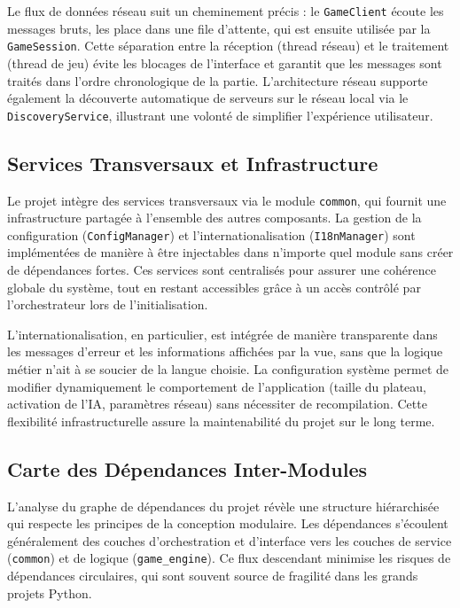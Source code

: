 \documentclass[a4paper]{article}
\begin{document}
Le flux de données réseau suit un cheminement précis : le \texttt{GameClient} écoute les messages bruts, les place dans une file d'attente, qui est ensuite utilisée par la \texttt{GameSession}. Cette séparation entre la réception (thread réseau) et le traitement (thread de jeu) évite les blocages de l'interface et garantit que les messages sont traités dans l'ordre chronologique de la partie. L'architecture réseau supporte également la découverte automatique de serveurs sur le réseau local via le \texttt{DiscoveryService}, illustrant une volonté de simplifier l'expérience utilisateur.

\subsection{Services Transversaux et Infrastructure}

Le projet intègre des services transversaux via le module \texttt{common}, qui fournit une infrastructure partagée à l'ensemble des autres composants. La gestion de la configuration (\texttt{ConfigManager}) et l'internationalisation (\texttt{I18nManager}) sont implémentées de manière à être injectables dans n'importe quel module sans créer de dépendances fortes. Ces services sont centralisés pour assurer une cohérence globale du système, tout en restant accessibles grâce à un accès contrôlé par l'orchestrateur lors de l'initialisation.

L'internationalisation, en particulier, est intégrée de manière transparente dans les messages d'erreur et les informations affichées par la vue, sans que la logique métier n'ait à se soucier de la langue choisie. La configuration système permet de modifier dynamiquement le comportement de l'application (taille du plateau, activation de l'IA, paramètres réseau) sans nécessiter de recompilation. Cette flexibilité infrastructurelle assure la maintenabilité du projet sur le long terme.

\subsection{Carte des Dépendances Inter-Modules}

L'analyse du graphe de dépendances du projet révèle une structure hiérarchisée qui respecte les principes de la conception modulaire. Les dépendances s'écoulent généralement des couches d'orchestration et d'interface vers les couches de service (\texttt{common}) et de logique (\texttt{game\_engine}). Ce flux descendant minimise les risques de dépendances circulaires, qui sont souvent source de fragilité dans les grands projets Python.
\end{document}
